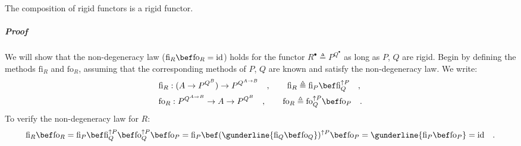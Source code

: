 The composition of rigid functors is a rigid functor.

\subparagraph{Proof}

We will show that the non-degeneracy law ($\text{fi}_{R}\bef\text{fo}_{R}=\text{id}$)
holds for the functor $R^{\bullet}\triangleq P^{Q^{\bullet}}$ as
long as $P$, $Q$ are rigid. Begin by defining the methods $\text{fi}_{R}$
and $\text{fo}_{R}$, assuming that the corresponding methods of $P$,
$Q$ are known and satisfy the non-degeneracy law. We write:
\begin{align*}
 & \text{fi}_{R}:(A\rightarrow P^{Q^{B}})\rightarrow P^{Q^{A\rightarrow B}}\quad,\quad\quad\text{fi}_{R}\triangleq\text{fi}_{P}\bef\text{fi}_{Q}^{\uparrow P}\quad,\\
 & \text{fo}_{R}:P^{Q^{A\rightarrow B}}\rightarrow A\rightarrow P^{Q^{B}}\quad,\quad\quad\text{fo}_{R}\triangleq\text{fo}_{Q}^{\uparrow P}\bef\text{fo}_{P}\quad.
\end{align*}
To verify the non-degeneracy law for $R$:
\[
\text{fi}_{R}\bef\text{fo}_{R}=\text{fi}_{P}\bef\text{fi}_{Q}^{\uparrow P}\bef\text{fo}_{Q}^{\uparrow P}\bef\text{fo}_{P}=\text{fi}_{P}\bef(\gunderline{\text{fi}_{Q}\bef\text{fo}_{Q}})^{\uparrow P}\bef\text{fo}_{P}=\gunderline{\text{fi}_{P}\bef\text{fo}_{P}}=\text{id}\quad.
\]
